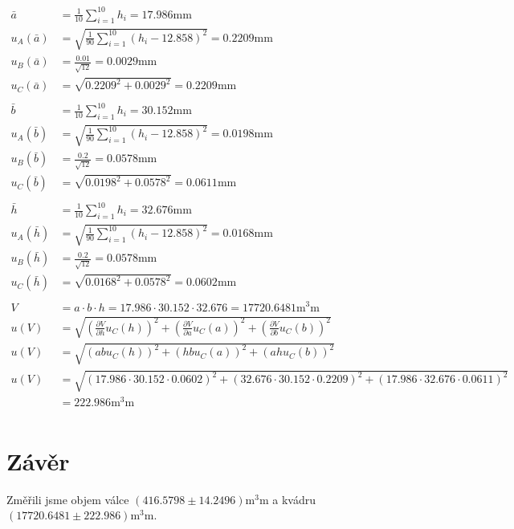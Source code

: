\documentclass[titlepage]{article}
\begin{document}
$$
\begin{aligned}
	\bar{a} &= \frac{1}{10} \sum_{i=1}^{10}h_i = 17.986 \si{\milli\meter}\\
	u_A(\bar{a}) &= \sqrt{\frac{1}{90}\sum_{i=1}^{10}(h_i-12.858)^2} = 0.2209 \si{\milli\meter}\\
	u_B(\bar{a}) &= \frac{0.01}{\sqrt{12}} = 0.0029 \si{\milli\meter}\\
	u_C(\bar{a}) &= \sqrt{0.2209^2+0.0029^2} = 0.2209 \si{\milli\meter}\\
	\\
	\bar{b} &= \frac{1}{10} \sum_{i=1}^{10}h_i = 30.152 \si{\milli\meter}\\
	u_A(\bar{b}) &= \sqrt{\frac{1}{90}\sum_{i=1}^{10}(h_i-12.858)^2} = 0.0198 \si{\milli\meter}\\
	u_B(\bar{b}) &= \frac{0.2}{\sqrt{12}} = 0.0578 \si{\milli\meter}\\
	u_C(\bar{b}) &= \sqrt{0.0198^2+0.0578^2} = 0.0611 \si{\milli\meter}\\
	\\
	\bar{h} &= \frac{1}{10} \sum_{i=1}^{10}h_i = 32.676 \si{\milli\meter}\\
	u_A(\bar{h}) &= \sqrt{\frac{1}{90}\sum_{i=1}^{10}(h_i-12.858)^2} = 0.0168 \si{\milli\meter}\\
	u_B(\bar{h}) &= \frac{0.2}{\sqrt{12}} = 0.0578 \si{\milli\meter}\\
	u_C(\bar{h}) &= \sqrt{0.0168^2+0.0578^2} = 0.0602 \si{\milli\meter}\\
	\\
	V &= a \cdot b \cdot h = 17.986 \cdot 30.152 \cdot 32.676 = 17720.6481 \si{\cubic\milli\meter}\\
	u(V) &= \sqrt{(\frac{\partial V}{\partial h}u_C(h))^2 + (\frac{\partial V}{\partial a}u_C(a))^2 + (\frac{\partial V}{\partial b}u_C(b))^2}\\
	u(V) &= \sqrt{(abu_C(h))^2 + (hbu_C(a))^2 + (ahu_C(b))^2}\\
	u(V) &= \sqrt{(17.986 \cdot 30.152 \cdot 0.0602)^2 + (32.676 \cdot 30.152 \cdot 0.2209)^2 + (17.986 \cdot 32.676 \cdot 0.0611)^2}\\ &= 222.986\si{\cubic\milli\meter}\\
\end{aligned}
$$

\section{Závěr}
Změřili jsme objem válce $(416.5798 \pm 14.2496) \si{\cubic\milli\meter}$ a kvádru $(17720.6481 \pm 222.986) \si{\cubic\milli\meter}$.
\end{document}
